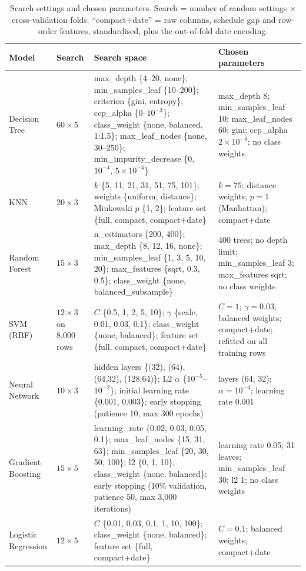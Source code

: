 \documentclass[12pt,a4paper]{article}
\begin{document}
\begin{table}[t]
\caption{Search settings and chosen parameters. Search = number of random settings $\times$ cross-validation folds. ``compact+date'' = raw columns, schedule gap and row-order features, standardised, plus the out-of-fold date encoding.}\label{tab:params}
\footnotesize\centering
\begin{tabular}{@{}l R{0.07\textwidth} R{0.38\textwidth} R{0.315\textwidth}@{}}
\toprule
Model & Search & Search space & Chosen parameters\\
\midrule
Decision Tree & $60\times5$ & max\_depth \{4--20, none\}; min\_samples\_leaf \{10--200\}; criterion \{gini, entropy\}; ccp\_alpha \{0--$10^{-3}$\}; class\_weight \{none, balanced, 1:1.5\}; max\_leaf\_nodes \{none, 30--250\}; min\_impurity\_decrease \{0, $10^{-4}$, $5\!\times\!10^{-4}$\} & max\_depth 8; min\_samples\_leaf 10; max\_leaf\_nodes 60; gini; ccp\_alpha $2\!\times\!10^{-4}$; no class weights\\
KNN & $20\times3$ & $k$ \{5, 11, 21, 31, 51, 75, 101\}; weights \{uniform, distance\}; Minkowski $p$ \{1, 2\}; feature set \{full, compact, compact+date\} & $k=75$; distance weights; $p=1$ (Manhattan); compact+date\\
Random Forest & $15\times3$ & n\_estimators \{200, 400\}; max\_depth \{8, 12, 16, none\}; min\_samples\_leaf \{1, 3, 5, 10, 20\}; max\_features \{sqrt, 0.3, 0.5\}; class\_weight \{none, balanced\_subsample\} & 400 trees; no depth limit; min\_samples\_leaf 3; max\_features sqrt; no class weights\\
SVM (RBF) & $12\times3$ on 8,000 rows & $C$ \{0.5, 1, 2, 5, 10\}; $\gamma$ \{scale, 0.01, 0.03, 0.1\}; class\_weight \{none, balanced\}; feature set \{full, compact, compact+date\} & $C=1$; $\gamma=0.03$; balanced weights; compact+date; refitted on all training rows\\
Neural Network & $10\times3$ & hidden layers \{(32), (64), (64,32), (128,64)\}; L2 $\alpha$ \{$10^{-5}$--$10^{-2}$\}; initial learning rate \{0.001, 0.003\}; early stopping (patience 10, max 300 epochs) & layers (64, 32); $\alpha=10^{-4}$; learning rate 0.001\\
Gradient Boosting & $15\times5$ & learning\_rate \{0.02, 0.03, 0.05, 0.1\}; max\_leaf\_nodes \{15, 31, 63\}; min\_samples\_leaf \{20, 30, 50, 100\}; l2 \{0, 1, 10\}; class\_weight \{none, balanced\}; early stopping (10\% validation, patience 50, max 3,000 iterations) & learning rate 0.05; 31 leaves; min\_samples\_leaf 30; l2 1; no class weights\\
Logistic Regression & $12\times5$ & $C$ \{0.01, 0.03, 0.1, 1, 10, 100\}; class\_weight \{none, balanced\}; feature set \{full, compact+date\} & $C=0.1$; balanced weights; compact+date\\
\bottomrule
\end{tabular}
\end{table}
\end{document}
